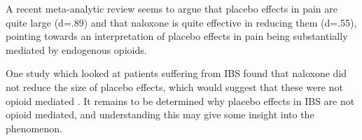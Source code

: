 A recent meta-analytic review \cite{Sauro2005} seems to argue that placebo effects in pain are quite large (d=.89) and that naloxone is quite effective in reducing them (d=.55), pointing towards an interpretation of placebo effects in pain being substantially mediated by endogenous opioids. 



One study which looked at patients suffering from IBS found that naloxone did not reduce the size of placebo effects, which would suggest that these were not opioid mediated \cite{Vase2005}. It remains to be determined why placebo effects in IBS are not opioid mediated, and understanding this may give some insight into the phenomenon. 




